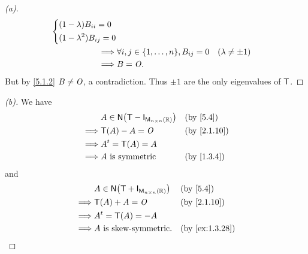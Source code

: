 \begin{proof}[(a)]
\begin{align*}
\begin{dcases}
                                                     (1 - \lambda) B_{i i} = 0 \\
                                                     (1 - \lambda^2) B_{i j} = 0
                                                   \end{dcases}                                 \\
    \implies & \forall i, j \in \set{1, \dots, n}, B_{i j} = 0               &  & (\lambda \neq \pm 1)        \\
    \implies & B = \zm.
  \end{align*}
  But by \cref{5.1.2} \(B \neq \mathit{O}\), a contradiction.
  Thus \(\pm 1\) are the only eigenvalues of \(\mathsf{T}\).
\end{proof}

\begin{proof}[(b)]
  We have
  \begin{align*}
             & A \in \ns{\T - \IT[\ms[n][n][\R]]} &  & \by{5.4}    \\
    \implies & \T(A) - A = \zm                    &  & \by{2.1.10} \\
    \implies & \tp{A} = \T(A) = A                                  \\
    \implies & A \text{ is symmetric}             &  & \by{1.3.4}
  \end{align*}
  and
  \begin{align*}
             & A \in \ns{\T + \IT[\ms[n][n][\R]]} &  & \by{5.4}       \\
    \implies & \T(A) + A = \zm                    &  & \by{2.1.10}    \\
    \implies & \tp{A} = \T(A) = -A                                    \\
    \implies & A \text{ is skew-symmetric}.       &  & \by{ex:1.3.28}
  \end{align*}
\end{proof}

